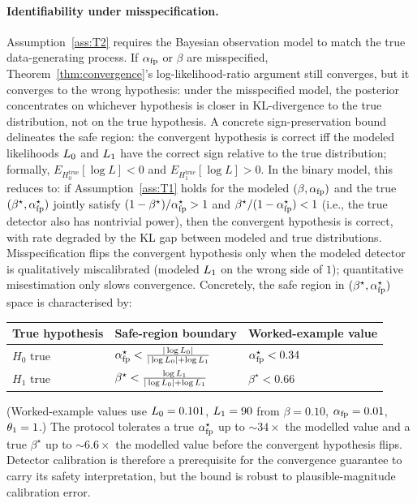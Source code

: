 \paragraph{Identifiability under misspecification.}
Assumption~\ref{ass:T2} requires the Bayesian observation model
to match the true data-generating process.  If $\alpha_{\mathrm{fp}}$ or
$\beta$ are misspecified, Theorem~\ref{thm:convergence}'s
log-likelihood-ratio argument still converges, but it converges
to the wrong hypothesis: under the misspecified model, the
posterior concentrates on whichever hypothesis is closer in
KL-divergence to the true distribution, not on the true
hypothesis.  A concrete sign-preservation bound delineates the
safe region: the convergent hypothesis is correct iff the
modeled likelihoods $L_0$ and $L_1$ have the correct sign
relative to the true distribution; formally,
$E_{H_0^{\mathrm{true}}}[\log L] < 0$ and
$E_{H_1^{\mathrm{true}}}[\log L] > 0$.  In the binary model,
this reduces to: if Assumption~\ref{ass:T1} holds for the
modeled $(\beta, \alpha_{\mathrm{fp}})$ and the true $(\beta^\star,
\alpha_{\mathrm{fp}}^\star)$ jointly satisfy
$(1 - \beta^\star)/\alpha_{\mathrm{fp}}^\star > 1$ and
$\beta^\star/(1 - \alpha_{\mathrm{fp}}^\star) < 1$ (i.e., the true detector
also has nontrivial power), then the convergent hypothesis is
correct, with rate degraded by the KL gap between modeled and
true distributions.  Misspecification flips the convergent
hypothesis only when the modeled detector is qualitatively
miscalibrated (modeled $L_1$ on the wrong side of $1$);
quantitative misestimation only slows convergence.  Concretely,
the safe region in $(\beta^{\star}, \alpha_{\mathrm{fp}}^{\star})$ space is
characterised by:
\begin{center}
\small
\begin{tabular}{@{}lll@{}}
\toprule
\textbf{True hypothesis} & \textbf{Safe-region boundary}
  & \textbf{Worked-example value} \\
\midrule
$H_0$ true & $\alpha_{\mathrm{fp}}^{\star} <
  \frac{|\log L_0|}{|\log L_0| + \log L_1}$
  & $\alpha_{\mathrm{fp}}^{\star} < 0.34$ \\[0.5em]
$H_1$ true & $\beta^{\star} <
  \frac{\log L_1}{|\log L_0| + \log L_1}$
  & $\beta^{\star} < 0.66$ \\
\bottomrule
\end{tabular}
\end{center}
\noindent (Worked-example values use $L_0 = 0.101$,
$L_1 = 90$ from $\beta = 0.10$, $\alpha_{\mathrm{fp}} = 0.01$,
$\theta_1 = 1$.)  The protocol tolerates a true
$\alpha_{\mathrm{fp}}^{\star}$ up to ${\sim}34\times$ the modelled value and
a true $\beta^{\star}$ up to ${\sim}6.6\times$ the modelled
value before the convergent hypothesis flips.  Detector
calibration is therefore a prerequisite for the convergence
guarantee to carry its safety interpretation, but the bound is
robust to plausible-magnitude calibration error.

